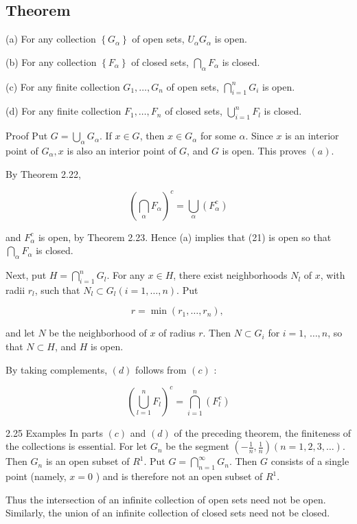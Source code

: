 \documentclass[10pt]{article}
\begin{document}
\subsection{Theorem}
(a) For any collection $\left\{G_{\alpha}\right\}$ of open sets, $U_{\alpha} G_{\alpha}$ is open.

(b) For any collection $\left\{F_{\alpha}\right\}$ of closed sets, $\bigcap_{\alpha} F_{\alpha}$ is closed.

(c) For any finite collection $G_{1}, \ldots, G_{n}$ of open sets, $\bigcap_{i=1}^{n} G_{i}$ is open.

(d) For any finite collection $F_{1}, \ldots, F_{n}$ of closed sets, $\bigcup_{i=1}^{n} F_{l}$ is closed.

Proof Put $G=\bigcup_{\alpha} G_{\alpha}$. If $x \in G$, then $x \in G_{\alpha}$ for some $\alpha$. Since $x$ is an interior point of $G_{\alpha}, x$ is also an interior point of $G$, and $G$ is open. This proves $(a)$.

By Theorem 2.22,

$$
\left(\bigcap_{\alpha} F_{\alpha}\right)^{c}=\bigcup_{\alpha}\left(F_{\alpha}^{c}\right)
$$

and $F_{\alpha}^{c}$ is open, by Theorem 2.23. Hence (a) implies that (21) is open so that $\bigcap_{\alpha} F_{\alpha}$ is closed.

Next, put $H=\bigcap_{i=1}^{n} G_{l}$. For any $x \in H$, there exist neighborhoods $N_{l}$ of $x$, with radii $r_{l}$, such that $N_{l} \subset G_{l}(i=1, \ldots, n)$. Put

$$
r=\min \left(r_{1}, \ldots, r_{n}\right) \text {, }
$$

and let $N$ be the neighborhood of $x$ of radius $r$. Then $N \subset G_{i}$ for $i=1$, $\ldots, n$, so that $N \subset H$, and $H$ is open.

By taking complements, $(d)$ follows from $(c)$ :

$$
\left(\bigcup_{l=1}^{n} F_{l}\right)^{c}=\bigcap_{i=1}^{n}\left(F_{l}^{c}\right)
$$

2.25 Examples In parts $(c)$ and $(d)$ of the preceding theorem, the finiteness of the collections is essential. For let $G_{n}$ be the segment $\left(-\frac{1}{n}, \frac{1}{n}\right)(n=1,2,3, \ldots)$. Then $G_{n}$ is an open subset of $R^{1}$. Put $G=\bigcap_{n=1}^{\infty} G_{n}$. Then $G$ consists of a single point (namely, $x=0$ ) and is therefore not an open subset of $R^{1}$.

Thus the intersection of an infinite collection of open sets need not be open. Similarly, the union of an infinite collection of closed sets need not be closed.
\end{document}

